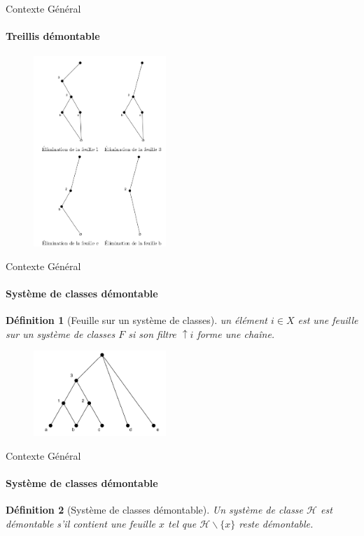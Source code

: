 \documentclass{beamer}
\newtheorem{de}{Définition}
\begin{document}
  \begin{frame}{Contexte Général}
  \framesubtitle{Treillis démontable}
   \begin{figure}
	\includegraphics[width=5cm]{images/e_tr_2.png} 
    \end{figure}
  \end{frame}

  \begin{frame}{Contexte Général}
  \framesubtitle{Système de classes démontable}
  \begin{de}[Feuille sur un système de classes]
  un élément $i \in X$ est une feuille sur un système de classes $F$ si son filtre  $\uparrow i$ forme une cha\^ine.
  \end{de}
   \begin{figure}
	\includegraphics[width=5cm]{images/fl.png} 
    \end{figure}
  \end{frame}


  \begin{frame}{Contexte Général}
  \framesubtitle{Système de classes démontable}
  \begin{de}[Système de classes démontable]
  Un système de classe $\mathcal{H}$ est démontable s'il contient une feuille $x$ tel que $\mathcal{H} \backslash \{x\}$ 
  reste démontable.
  \end{de}
  \end{frame}
\end{document}

